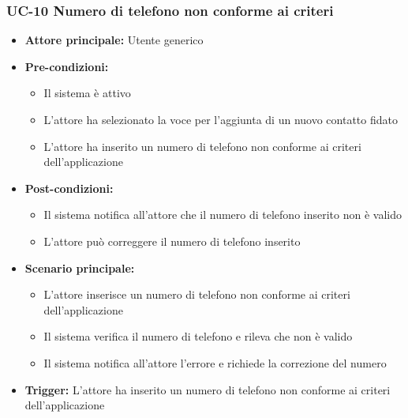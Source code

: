 \documentclass[a4paper,12pt]{article}
\begin{document}
\subsubsection{UC-10 Numero di telefono non conforme ai criteri} \label{subsec:UC-10}
\begin{itemize}
    \item \textbf{Attore principale:} Utente generico
    \item \textbf{Pre-condizioni:}
    \begin{itemize}
        \item Il sistema è attivo
        \item L'attore ha selezionato la voce per l'aggiunta di un nuovo contatto fidato
        \item L'attore ha inserito un numero di telefono non conforme ai criteri dell'applicazione
    \end{itemize}
    \item \textbf{Post-condizioni:} 
    \begin{itemize}
        \item Il sistema notifica all'attore che il numero di telefono inserito non è valido
        \item L'attore può correggere il numero di telefono inserito
    \end{itemize}
    \item \textbf{Scenario principale:} 
    \begin{itemize}        
        \item L'attore inserisce un numero di telefono non conforme ai criteri dell'applicazione
        \item Il sistema verifica il numero di telefono e rileva che non è valido
        \item Il sistema notifica all'attore l'errore e richiede la correzione del numero
    \end{itemize}
    \item \textbf{Trigger:} L'attore ha inserito un numero di telefono non conforme ai criteri dell'applicazione
\end{itemize}
\end{document}
